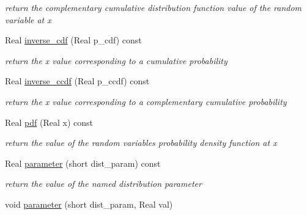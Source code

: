 \begin{DoxyCompactItemize}
\begin{DoxyCompactList}\small\item\em return the complementary cumulative distribution function value of the random variable at x \end{DoxyCompactList}\item 
Real \hyperlink{classPecos_1_1HypergeometricRandomVariable_a918a1aac05ca349ea5313eebcba46c3e}{inverse\+\_\+cdf} (Real p\+\_\+cdf) const \label{classPecos_1_1HypergeometricRandomVariable_a918a1aac05ca349ea5313eebcba46c3e}

\begin{DoxyCompactList}\small\item\em return the x value corresponding to a cumulative probability \end{DoxyCompactList}\item 
Real \hyperlink{classPecos_1_1HypergeometricRandomVariable_afda003a1f59ff6930902cd5c8601f49b}{inverse\+\_\+ccdf} (Real p\+\_\+ccdf) const \label{classPecos_1_1HypergeometricRandomVariable_afda003a1f59ff6930902cd5c8601f49b}

\begin{DoxyCompactList}\small\item\em return the x value corresponding to a complementary cumulative probability \end{DoxyCompactList}\item 
Real \hyperlink{classPecos_1_1HypergeometricRandomVariable_a8ec69265f428e17c1707133cb137a819}{pdf} (Real x) const \label{classPecos_1_1HypergeometricRandomVariable_a8ec69265f428e17c1707133cb137a819}

\begin{DoxyCompactList}\small\item\em return the value of the random variable\textquotesingle{}s probability density function at x \end{DoxyCompactList}\item 
Real \hyperlink{classPecos_1_1HypergeometricRandomVariable_aa891dab1ae9a225f493e3a0e5032b778}{parameter} (short dist\+\_\+param) const \label{classPecos_1_1HypergeometricRandomVariable_aa891dab1ae9a225f493e3a0e5032b778}

\begin{DoxyCompactList}\small\item\em return the value of the named distribution parameter \end{DoxyCompactList}\item 
void \hyperlink{classPecos_1_1HypergeometricRandomVariable_ae8e123224f588aee676d5d56d5ca900d}{parameter} (short dist\+\_\+param, Real val)\label{classPecos_1_1HypergeometricRandomVariable_ae8e123224f588aee676d5d56d5ca900d}


\end{DoxyCompactItemize}
